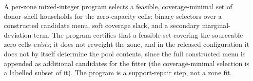 %

A per-zone mixed-integer program selects a feasible, coverage-minimal set of
donor--shell households for the zero-capacity cells: binary selectors over a
constructed candidate menu, soft coverage slack, and a secondary
marginal-deviation term. The program certifies that a feasible set covering the
sourceable zero cells \emph{exists}; it does not reweight the zone, and in the
released configuration it does not by itself determine the pool contents, since
the full constructed menu is appended as additional candidates for the fitter
(the coverage-minimal selection is a labelled subset of it). The program is a
support-repair step, not a zone fit.

